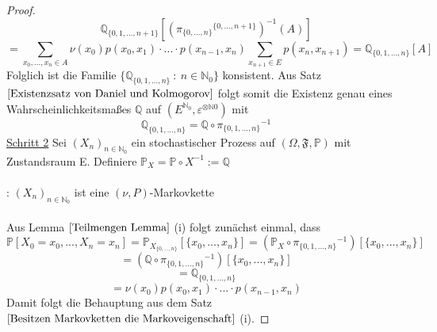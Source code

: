 \documentclass[a4paper,12pt]{scrartcl}
\theoremstyle{definition}
\begin{document}
\begin{proof}
\begin{equation*}
\mathbb{Q}_{\lbrace 0,1,...,n+1 \rbrace}[({\pi_{\lbrace 0,...,n \rbrace}}^{\lbrace 0,...,n+1 \rbrace})^{-1}(A)]
\end{equation*}
\begin{equation*}
= \sum_{x_{0},...,x_{n} \in A} \nu(x_{0})p(x_{0},x_{1}) \cdot ... \cdot p(x_{n-1},x_{n}) \sum_{x_{n+1} \in E} p(x_{n},x_{n+1}) = \mathbb{Q}_{\lbrace 0,1,...,n \rbrace}[A] 
\end{equation*}
Folglich ist die Familie $\lbrace \mathbb{Q}_{\lbrace 0,1,...,n \rbrace} \: : \: n\in \mathbb{N}_{0}\rbrace$ konsistent. Aus Satz $\ref{Existenzsatz von Daniel und Kolmogorov}$ folgt somit die Existenz genau eines Wahrscheinlichkeitsmaßes $\mathbb{Q}$ auf $(E^{\mathbb{N}_{0}},\varepsilon^{ \otimes \mathbb{N}{0}})$ mit
\begin{equation*}
\mathbb{Q}_{\lbrace 0,1,...,n \rbrace} = \mathbb{Q} \circ {\pi_{\lbrace 0,1,...,n \rbrace}}^{-1}
\end{equation*}
\underline{Schritt 2} Sei $(X_{n})_{n \in \mathbb{N}_{0}}$ ein stochastischer Prozess auf $(\Omega, \mathfrak{F}, \mathbb{P})$ mit Zustandsraum E. Definiere $\mathbb{P}_{X} = \mathbb{P} \circ X^{-1} := \mathbb{Q}$
\\
\\
: $(X_{n})_{n \in \mathbb{N}_{0}}$ ist eine $(\nu,P)$-Markovkette
\\
\\
Aus Lemma $\ref{Teilmengen Lemma}$ (i) folgt zunächst einmal, dass
\begin{equation*}
\mathbb{P}[X_{0} = x_{0},...,X_{n} = x_{n}] = \mathbb{P}_{X_{\lbrace 0,...,n \rbrace}}[\lbrace x_{0},...,x_{n}  \rbrace] = (\mathbb{P}_{X} \circ {\pi_{\lbrace 0,1,...,n \rbrace}}^{-1})[\lbrace x_{0},...,x_{n}  \rbrace]
\end{equation*}
\begin{equation*}
= (\mathbb{Q} \circ {\pi_{\lbrace 0,1,...,n \rbrace}}^{-1})[\lbrace x_{0},...,x_{n}  \rbrace]
\end{equation*}
\begin{equation*}
= \mathbb{Q}_{\lbrace 0,1,...,n \rbrace}
\end{equation*}
\begin{equation*}
= \nu(x_{0})p(x_{0},x_{1}) \cdot ... \cdot p(x_{n-1},x_{n})
\end{equation*}
Damit folgt die Behauptung aus dem Satz $\ref{Besitzen Markovketten die Markoveigenschaft}$ (i).
\end{proof}
\end{document}
